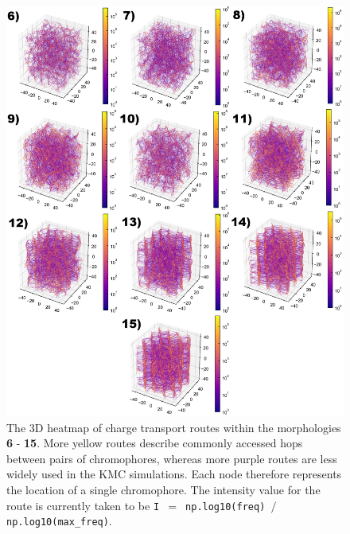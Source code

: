 \documentclass[12pt]{article}
\begin{document}
\begin{figure}[h!]\centering
	\includegraphics[width=\textwidth]{Figures/3dHoleFrame.png}
    \caption{The 3D heatmap of charge transport routes within the morphologies \textbf{6} - \textbf{15}.
    More yellow routes describe commonly accessed hops between pairs of chromophores, whereas more purple routes are less widely used in the KMC simulations.
    Each node therefore represents the location of a single chromophore.
The intensity value for the route is currently taken to be \texttt{I $=$ np.log10(freq) $/$ np.log10(max\_freq)}.}
	\label{fig:3dNetworkFrame}
\end{figure}
\end{document}
